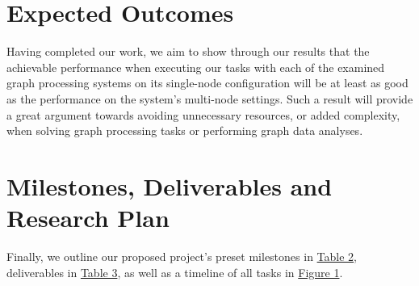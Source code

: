 \documentclass[a4paper,11pt]{article}
\begin{document}

\section{Expected Outcomes} \label{outcomes}

\par Having completed our work, we aim to show through our results that the achievable performance when executing our tasks with each of the examined graph processing systems on its single-node configuration will be at least as good as the performance on the system's multi-node settings. Such a result will provide a great argument towards avoiding unnecessary resources, or added complexity, when solving graph processing tasks or performing graph data analyses.




\section{Milestones, Deliverables and Research Plan} \label{milestones}

\par Finally, we outline our proposed project's preset milestones in \hyperref[table:milestones]{Table 2}, deliverables in \hyperref[table:deliverables]{Table 3}, as well as a timeline of all tasks in \hyperref[fig:gantt]{Figure 1}.
\end{document}
